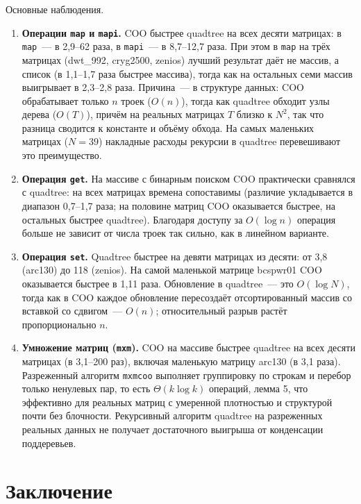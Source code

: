 \documentclass[a4paper]{article}
\begin{document}
Основные наблюдения.

\begin{enumerate}
    \item \textbf{Операции \texttt{map} и \texttt{mapi}.} COO быстрее quadtree на всех десяти матрицах: в \texttt{map}~--- в 2,9--62 раза, в \texttt{mapi}~--- в 8,7--12,7 раза. При этом в \texttt{map} на трёх матрицах (dwt\_992, cryg2500, zenios) лучший результат даёт не массив, а список (в 1,1--1,7 раза быстрее массива), тогда как на остальных семи массив выигрывает в 2,3--2,8 раза. Причина~--- в структуре данных: COO обрабатывает только $n$ троек ($O(n)$), тогда как quadtree обходит узлы дерева ($O(T)$), причём на реальных матрицах $T$ близко к $N^2$, так что разница сводится к константе и объёму обхода. На самых маленьких матрицах ($N = 39$) накладные расходы рекурсии в quadtree перевешивают это преимущество.
    \item \textbf{Операция \texttt{get}.} На массиве с бинарным поиском COO практически сравнялся с quadtree: на всех матрицах времена сопоставимы (различие укладывается в диапазон 0,7--1,7 раза; на половине матриц COO оказывается быстрее, на остальных быстрее quadtree). Благодаря доступу за $O(\log n)$ операция больше не зависит от числа троек так сильно, как в линейном варианте.
    \item \textbf{Операция \texttt{set}.} Quadtree быстрее на девяти матрицах из десяти: от 3,8 (arc130) до 118 (zenios). На самой маленькой матрице bcspwr01 COO оказывается быстрее в 1,11 раза. Обновление в quadtree~--- это $O(\log N)$, тогда как в COO каждое обновление пересоздаёт отсортированный массив со вставкой со сдвигом~--- $O(n)$; относительный разрыв растёт пропорционально $n$.
    \item \textbf{Умножение матриц (\texttt{mxm}).} COO на массиве быстрее quadtree на всех десяти матрицах (в 3,1--200 раз), включая маленькую матрицу arc130 (в 3,1 раза). Разреженный алгоритм \texttt{mxmcoo} выполняет группировку по строкам и перебор только ненулевых пар, то есть $\Theta(k\log k)$ операций, лемма 5, что эффективно для реальных матриц с умеренной плотностью и структурой почти без блочности. Рекурсивный алгоритм quadtree на разреженных реальных данных не получает достаточного выигрыша от конденсации поддеревьев.
\end{enumerate}

\section{Заключение}
\end{document}
